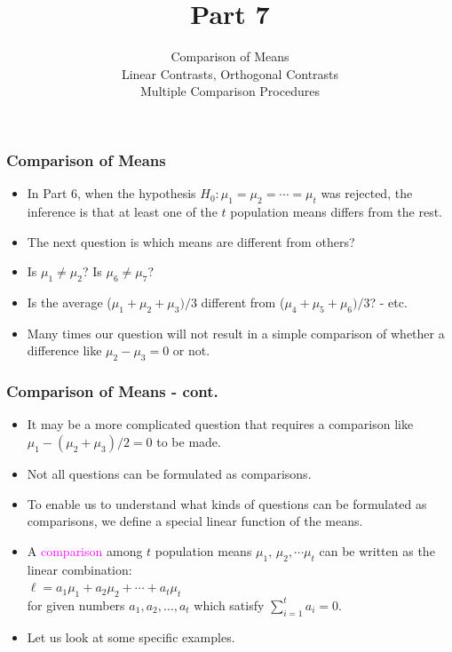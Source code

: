 \documentclass[xcolor=dvipsnames,12pt]{beamer}
\title[]{Part 7}
\author[Stat 801]{Comparison of Means\\
Linear Contrasts, Orthogonal Contrasts\\
Multiple Comparison Procedures\\}
\date{}
\begin{document}
\begin{frame}[plain]
  \titlepage
\end{frame}




\begin{frame}
\frametitle{Comparison of Means}
\begin{itemize}
\item In Part 6, when the hypothesis $H_0: \mu_1 = \mu_2 = \cdots = \mu_t$ was
rejected, the inference is that at least one of the $t$
population means differs from the rest. 
\item  The next question is
which means are different from others?  
\item Is $\mu_1 \neq \mu_2$? Is $\mu_6 \neq \mu_7$?
\item Is the average ($\mu_1 + \mu_2 + \mu_3)/3$
different from ($\mu_4 + \mu_5 + \mu_6)/3$? - etc.
\item  Many times our question  will not result in a simple comparison
of whether a difference like $\mu_2 - \mu_3 = 0$ or not. 
\end{itemize}
\end{frame}



\begin{frame}
\frametitle{Comparison of Means - cont.}
\begin{itemize}
\item It may be a  more complicated question that requires a comparison like 
$\mu_1 - (\mu_2 + \mu_3)/2 = 0$ to  be made.
\item Not all questions can be formulated as comparisons. 
\item To enable us  to understand what kinds of questions  can be formulated as 
comparisons, we define a special linear function of the means.
\item A {\textcolor{magenta}{comparison}} among $t$ population
means $\mu_1,\,\mu_2, \cdots \mu_t$ can be written as the linear combination:\\[.05in]
\hspace*{1in}$\ell = a_1\mu_1 + a_2\mu_2 + \cdots + a_t\mu_t$\\[.05in]
 for given numbers $a_1, a_2, \ldots, a_t$ which satisfy
$\sum_{i=1}^t a_i = 0$.
\item Let us look at some specific examples.
\end{itemize}
\end{frame}
\end{document}
